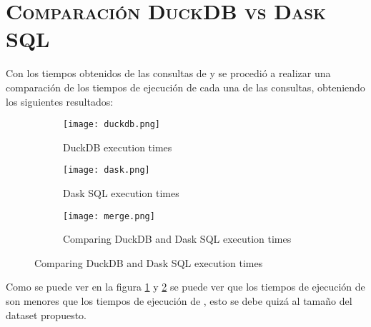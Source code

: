 \section*{\scshape\textbf{Comparación DuckDB vs Dask SQL}}

  Con los tiempos obtenidos de las consultas de  y  se
  procedió a realizar una comparación de los tiempos de ejecución de cada una
  de las consultas, obteniendo los siguientes resultados:

  \begin{figure}[!ht]
    \centering
    \begin{subfigure}[b]{0.48\textwidth}
      \centering
      \texttt{[image: duckdb.png]}
      \caption{DuckDB execution times}
      \label{fig:duckdb_times}
    \end{subfigure}
    \hfill
    \begin{subfigure}[b]{0.48\textwidth}
      \centering
      \texttt{[image: dask.png]}
      \caption{Dask SQL execution times}
      \label{fig:dask_times}
    \end{subfigure}
    \begin{subfigure}[b]{0.6\textwidth}
      \centering
      \texttt{[image: merge.png]}
      \caption{Comparing DuckDB and Dask SQL execution times}
      \label{fig:comparing_times}
    \end{subfigure}
  \end{figure}

  Como se puede ver en la figura \ref{fig:duckdb_times} y \ref{fig:dask_times}
  se puede ver que los tiempos de ejecución de  son menores que los
  tiempos de ejecución de , esto se debe quizá al tamaño del dataset
  propuesto.
